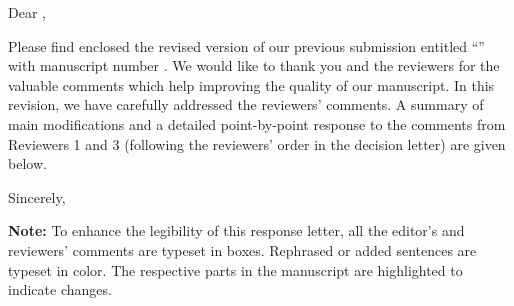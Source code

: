 \thispagestyle{empty}
\noindent Dear \editorname,

Please find enclosed the revised version of our previous submission entitled \enquote{\thetitle} with manuscript number \manuscript. We would like to thank you and the reviewers for the valuable comments which help improving the quality of our manuscript.
In this revision, we have carefully addressed the reviewers' comments. A summary of main modifications and a detailed point-by-point response to the comments from Reviewers 1 and 3 (following the reviewers' order in the decision letter) are given below.

\vspace{8em}

\noindent Sincerely,

\noindent\theauthor

\vfill
\textbf{Note:} To enhance the legibility of this response letter, all the editor's and reviewers' comments are typeset in boxes. Rephrased or added sentences are typeset in color. The respective parts in the manuscript are highlighted to indicate changes.